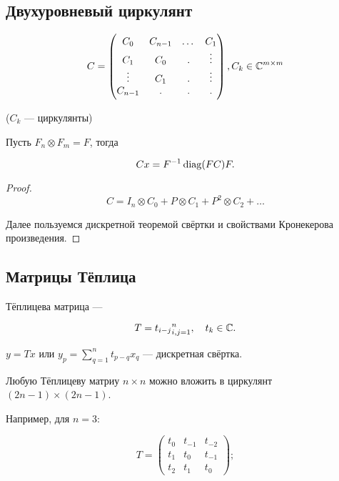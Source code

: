 \subsection{Двухуровневый циркулянт}

\begin{definition}
    \[
        C = \begin{pmatrix}
            C_0 & C_{n - 1} & \dots & C_1 \\
            C_1 & C_0 & . & \vdots \\
            \vdots & C_1 & . & \vdots \\
            C_{n - 1} & . & . & .
        \end{pmatrix}, C_k \in \mathbb{C}^{m \times m}
    \]

    ($C_k$ --- циркулянты)
\end{definition}

\begin{theorem}
    Пусть $F_n \otimes F_m = F$, тогда

    \[
        C x = F^{-1} \operatorname{diag}(F C) F.
    \]
\end{theorem}

\begin{proof}
    \[
        C = I_n \otimes C_0 + P \otimes C_1 + P^2 \otimes C_2 + \ldots
    \]

    Далее пользуемся дискретной теоремой свёртки и свойствами Кронекерова
    произведения.
\end{proof}

\subsection{Матрицы Тёплица}

\begin{definition}
    Тёплицева матрица ---

    \[
        T = { t_{i - j} }_{i, j = 1}^n, \quad t_k \in \mathbb{C}.
    \]
\end{definition}

$y = T x$ или $y_p = \sum_{q = 1}^n t_{p - q} x_q$ --- дискретная свёртка.

Любую Тёплицеву матриу $n \times n$ можно вложить в циркулянт
$(2n - 1) \times (2n - 1)$.

Например, для $n = 3$:

\[
    T = \begin{pmatrix}
        t_0 & t_{-1} & t_{-2} \\
        t_1 & t_0 & t_{-1} \\
        t_2 & t_1 & t_0
    \end{pmatrix};
\]

